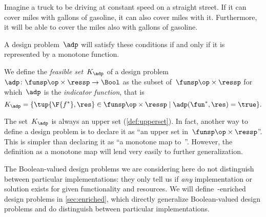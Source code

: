 \begin{example}
  Imagine a truck to be driving at constant speed on a straight street. If it can cover \unit[100]{miles} with \unit[5]{gallons} of gasoline, it can also cover \unit[80]{miles} with it. Furthermore, it will be able to cover the \unit[100]{miles} also with \unit[10]{gallons} of gasoline.
\end{example}

A design problem~$\adp$ will satisfy these conditions if and only if it is represented by a monotone function.
\begin{definition}
  We define the \emph{feasible set}~$K_\adp$ of a design problem~$\adp\colon \funsp\op \times \ressp\to \Bool$ as the subset of~$\funsp \op\times \ressp$ for which~$\adp$ is the \emph{indicator function}, that is
  \begin{equation}
    K_\adp = \{ \tup{\F{f^*},\res} \in \funsp \op\times \ressp  \mid
    \adp(\fun^*, \res) = \true
    \}.
  \end{equation}
\end{definition}
\begin{remark}
  The set~$K_\adp$ is always an upper set (\cref{def:upperset}). In fact, another way to define a design problem is to declare it as ``an upper
  set in~$\funsp\op \times \ressp$''. This is simpler than declaring it as ``a monotone map to~\Bool''. However, the definition as a monotone map will lend very easily to further generalization.
\end{remark}
The Boolean-valued design problems we are considering here do not distinguish between particular implementations: they only tell us if \emph{any} implementation or solution exists for given functionality and resources. We will define~\Set-enriched design problems in \cref{sec:enriched}, which directly generalize Boolean-valued design problems and do distinguish between particular implementations.

